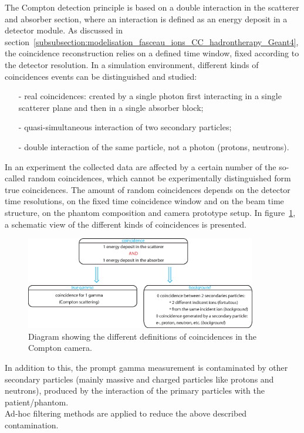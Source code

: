 The Compton detection principle is based on a double interaction in the scatterer and absorber section, where an interaction is defined as an energy deposit in a detector module. As discussed in section~\ref{subsubsection:modelisation_fasceau_ions_CC_hadrontherapy_Geant4}, the coincidence reconstruction relies on a defined time window, fixed according to the detector resolution. In a simulation environment, different kinds of coincidences events can be distinguished and studied: 
\begin{itemize}
\item[-] real coincidences: created by a single photon first interacting in a single scatterer plane and then in a single absorber block;
\item[-] quasi-simultaneous interaction of two secondary particles;
\item[-] double interaction of the same particle, not a photon (protons, neutrons).
\end{itemize}

In an experiment the collected data are affected by a certain number of the so-called random coincidences, which cannot be experimentally distinguished form true coincidences. The amount of random coincidences depends on the detector time resolutions, on the fixed time coincidence window and on the beam time structure, on the phantom composition and camera prototype setup. In figure~\ref{fig:fig_explication_coincidence_CC_simulation_Hadronth}, a schematic view of the different kinds of coincidences is presented.

\begin{figure}
  \centering
  \includegraphics[width=0.9\textwidth]{./Figure/Schema_coincidence_EN.eps}
  \caption{Diagram showing the different definitions of coincidences in the Compton camera.}
  \label{fig:fig_explication_coincidence_CC_simulation_Hadronth}
\end{figure}

In addition to this, the prompt gamma measurement is contaminated by other secondary particles (mainly massive and charged particles like protons and neutrons), produced by the interaction of the primary particles with the patient/phantom.\\
Ad-hoc filtering methods are applied to reduce the above described contamination.


